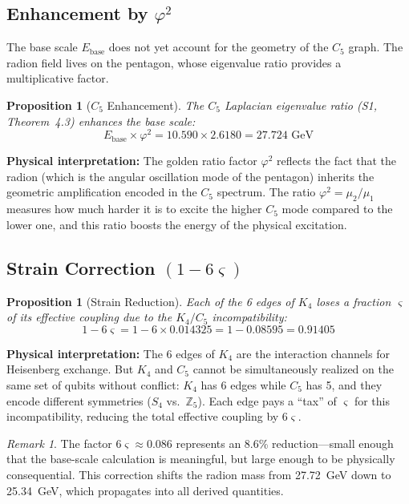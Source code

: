 \documentclass[11pt,a4paper]{article}
\newtheorem{proposition}[theorem]{Proposition}
\theoremstyle{definition}
\theoremstyle{remark}
\newtheorem{remark}[theorem]{Remark}
\newcommand{\gr}{\varphi}
\newcommand{\gs}{\varsigma}
\newcommand{\Ebase}{E_{\mathrm{base}}}
\begin{document}
\subsection{Enhancement by $\gr^2$}

The base scale $\Ebase$ does not yet account for the geometry of the $C_5$ graph. The radion field lives on the pentagon, whose eigenvalue ratio provides a multiplicative factor.

\begin{proposition}[$C_5$ Enhancement]
\label{prop:phi2}
The $C_5$ Laplacian eigenvalue ratio (S1, Theorem~4.3) enhances the base scale:
\begin{equation}
\Ebase \times \gr^2 = 10.590 \times 2.6180 = 27.724 \text{ GeV}
\end{equation}
\end{proposition}

\textbf{Physical interpretation:} The golden ratio factor $\gr^2$ reflects the fact that the radion (which is the angular oscillation mode of the pentagon) inherits the geometric amplification encoded in the $C_5$ spectrum. The ratio $\gr^2 = \mu_2/\mu_1$ measures how much harder it is to excite the higher $C_5$ mode compared to the lower one, and this ratio boosts the energy of the physical excitation.

\subsection{Strain Correction $(1 - 6\gs)$}

\begin{proposition}[Strain Reduction]
\label{prop:strain}
Each of the 6 edges of $K_4$ loses a fraction $\gs$ of its effective coupling due to the $K_4/C_5$ incompatibility:
\begin{equation}
1 - 6\gs = 1 - 6 \times 0.014325 = 1 - 0.08595 = 0.91405
\end{equation}
\end{proposition}

\textbf{Physical interpretation:} The 6 edges of $K_4$ are the interaction channels for Heisenberg exchange. But $K_4$ and $C_5$ cannot be simultaneously realized on the same set of qubits without conflict: $K_4$ has 6 edges while $C_5$ has 5, and they encode different symmetries ($S_4$ vs.\ $\mathbb{Z}_5$). Each edge pays a ``tax'' of $\gs$ for this incompatibility, reducing the total effective coupling by $6\gs$.

\begin{remark}
The factor $6\gs \approx 0.086$ represents an 8.6\% reduction---small enough that the base-scale calculation is meaningful, but large enough to be physically consequential. This correction shifts the radion mass from 27.72~GeV down to 25.34~GeV, which propagates into all derived quantities.
\end{remark}
\end{document}
